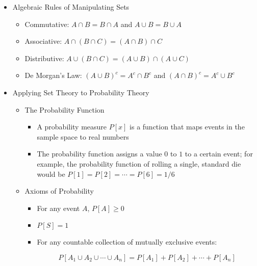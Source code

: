 \begin{itemize}
  \item Algebraic Rules of Manipulating Sets

    \begin{itemize}

      \item Commutative: $A\cap B= B\cap A$ and $A\cup B = B\cup A$

      \item Associative: $A\cap (B\cap C)= (A\cap B)\cap C$

      \item Distributive: $A\cup (B\cap C)= (A\cup B)\cap (A\cup C)$

      \item De Morgan's Law: $(A\cup B)^c = A^c\cap B^c$ and $(A\cap B)^c=A^c\cup B^c$

    \end{itemize}

  \item Applying Set Theory to Probability Theory

    \begin{itemize}

      \item The Probability Function

        \begin{itemize}

          \item A probability measure $P[x]$ is a function that maps events in the sample space to real numbers

          \item The probability function assigns a value $0$ to $1$ to a certain event; for example, the probability function of rolling a single, standard die would be $P[1]=P[2]=\cdots=P[6]=1/6$

        \end{itemize}

      \item Axioms of Probability

        \begin{itemize}

          \item For any event $A$, $P[A]\geq 0$

          \item $P[S]=1$

          \item For any countable collection of mutually exclusive events:

            $$P[A_1\cup A_2\cup\cdots\cup A_n]=P[A_1]+P[A_2]+\cdots+P[A_n]$$


\end{itemize}
\end{itemize}
\end{itemize}
